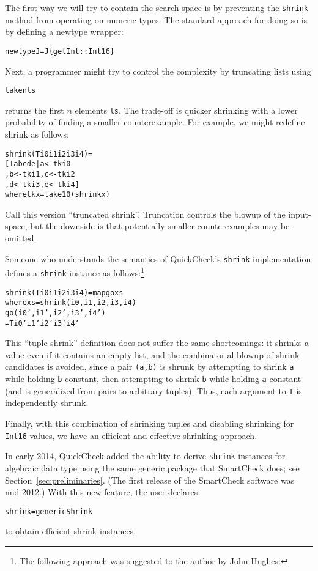 \documentclass{sigplanconf}
\newenvironment{code}{\begin{alltt}\footnotesize}{\end{alltt}}
\newcommand{\ttp}[1]{\texttt{#1}}
\begin{document}
The first way we will try to contain the search space is by preventing the
\ttp{shrink} method from operating on numeric types.  The standard approach for
doing so is by defining a newtype wrapper:
%
\begin{code}
newtype J = J \{ getInt :: Int16 \}
\end{code}
%
\noindent
Next, a programmer might try to control the complexity by truncating lists using
%
\begin{code}
take n ls
\end{code}
%
returns the first $n$ elements \ttp{ls}.  The trade-off is quicker shrinking
with a lower probability of finding a smaller counterexample.  For example, we
might redefine shrink as follows:
%
\begin{samepage}
\begin{code}
shrink (T i0 i1 i2 i3 i4) =
  [ T a b c d e | a <- tk i0
                , b <- tk i1, c <- tk i2
                , d <- tk i3, e <- tk i4 ]
  where tk x = take 10 (shrink x)
\end{code}
\end{samepage}
%
\noindent
Call this version ``truncated shrink''.  Truncation controls the blowup of the
input-space, but the downside is that potentially smaller counterexamples may be
omitted.

Someone who understands the semantics of QuickCheck's \ttp{shrink}
implementation defines a \ttp{shrink} instance as follows:\footnote{The
  following approach was suggested to the author by John Hughes.}
%
\begin{code}
shrink (T i0 i1 i2 i3 i4) = map go xs
  where xs = shrink (i0, i1, i2, i3, i4)
        go (i0', i1', i2', i3', i4')
           = T i0' i1' i2' i3' i4'
\end{code}
%
\noindent
This ``tuple shrink'' definition does not suffer the same shortcomings: it
shrinks a value even if it contains an empty list, and the combinatorial blowup
of shrink candidates is avoided, since a pair \ttp{(a,b)} is shrunk by
attempting to shrink \ttp{a} while holding \ttp{b} constant, then attempting to
shrink \ttp{b} while holding \ttp{a} constant (and is generalized from pairs to
arbitrary tuples).  Thus, each argument to \ttp{T} is independently shrunk.

Finally, with this combination of shrinking tuples and disabling shrinking for
\ttp{Int16} values, we have an efficient and effective shrinking approach.

In early 2014, QuickCheck added the ability to derive \ttp{shrink} instances for
algebraic data type using the same generic package that SmartCheck does; see
Section~\ref{sec:preliminaries}.  (The first release of the SmartCheck software
was mid-2012.)  With this new feature, the user declares
%
\begin{code}
shrink = genericShrink
\end{code}
%
\noindent
to obtain efficient shrink instances.
\end{document}
